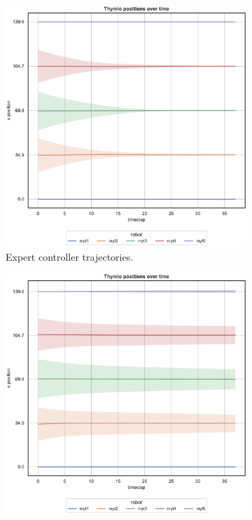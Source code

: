 \begin{figure}[!htb]
	\begin{center}
		\begin{subfigure}[h]{0.49\textwidth}
			\centering
			\includegraphics[width=\textwidth]{contents/images/net-d6/position-overtime-omniscient}%
			\caption{Expert controller trajectories.}
		\end{subfigure}
		\hfill
		\begin{subfigure}[h]{0.49\textwidth}
			\centering
			\includegraphics[width=\textwidth]{contents/images/net-d6/position-overtime-learned_distributed}

\end{subfigure}
\end{center}
\end{figure}
